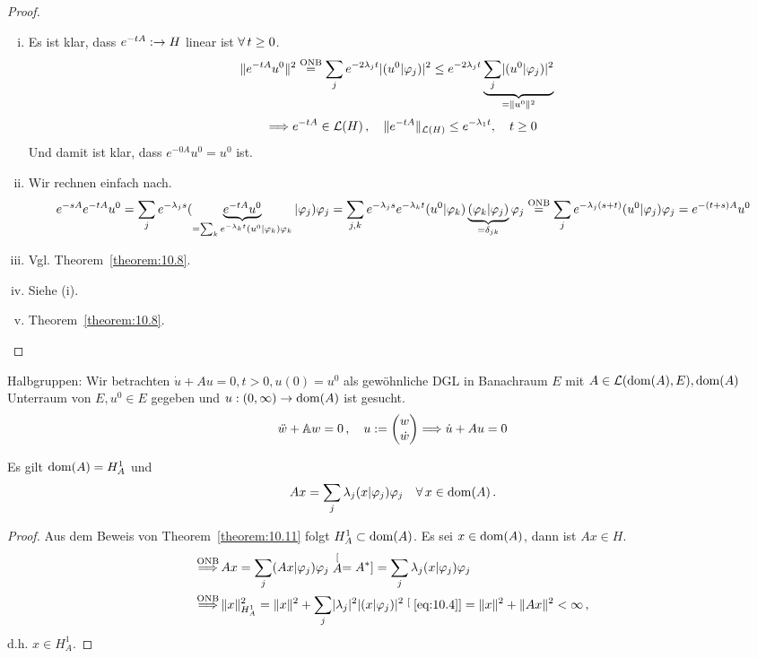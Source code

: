 \begin{proof}
\begin{enumerate}[(i)]
\item Es ist klar, dass $e^{-tA}: \rightarrow H$ linear ist $\forall \, t\geq 0$.
\begin{align*}
	\lVert e^{-tA} u^0\rVert^2 & \stackrel{\scriptsize\text{ONB}}=\sum_j e^{-2\lambda_j t} \lvert (u^0|\varphi_j)\rvert^2 
	 \leq e^{-2\lambda_j t} \underbrace{\sum_j \lvert (u^0|\varphi_j)\rvert^2}_{=\lVert u^0\rVert^2} 
\end{align*}
\[
	\Longrightarrow e^{-tA} \in \mathcal L(H)\, , \quad \lVert e^{-tA}\rVert_{\mathcal L(H)} \leq e^{-\lambda_1 t} , \quad t \geq 0
\]
Und damit ist klar, dass $e^{-0A} u^0 = u^0$ ist.
\item Wir rechnen einfach nach.
\begin{dmath*}
	e^{-sA} e^{-tA} u^0 = \sum_j e^{-\lambda_j s} (\underbrace{e^{-tA} u^0}_{=\sum_k e^{-\lambda_k t} (u^0|\varphi_k)\varphi_k} |\varphi_j)\varphi_j 
	= \sum_{j,k} e^{-\lambda_j s}e^{-\lambda_k t} (u^0 | \varphi_k) \underbrace{(\varphi_k |\varphi_j)}_{=\delta_{jk}} \varphi_j \\
	\stackrel{\scriptsize\text{ONB}}= \sum_j e^{-\lambda_j (s+t)} (u^0|\varphi_j)\varphi_j
	= e^{-(t+s)A} u^0
\end{dmath*}
\item Vgl. Theorem~\ref{theorem:10.8}.
\item Siehe (i).
\item Theorem~\ref{theorem:10.8}.\qedhere
\end{enumerate}
\end{proof}

Halbgruppen: Wir betrachten $\dot u + A u = 0, t>0, u(0)= u^0$ als gewöhnliche DGL in Banachraum $E$ mit $A\in\mathcal L(\operatorname{dom}(A),E), \operatorname{dom}(A)$ Unterraum von $E, u^0\in E$ gegeben und $u:(0,\infty) \rightarrow \operatorname{dom}(A)$ ist gesucht.
\[
	\ddot w + \mathbb{A} w = 0 \, , \quad u := \begin{pmatrix} w \\ \dot w \end{pmatrix}  \Longrightarrow \dot u + A u = 0
\]

\begin{kor}
\label{kor:10.12}
Es gilt $\operatorname{dom}(A) = H^1_A$ und
\[
	Ax = \sum_j \lambda_j (x|\varphi_j)\varphi_j \quad  \forall \, x \in \operatorname{dom}(A) \, .
\]
\end{kor}

\begin{proof}
Aus dem Beweis von Theorem~\ref{theorem:10.11} folgt $H^1_A \subset \operatorname{dom}(A)$. Es sei $x \in \operatorname{dom} (A)$, dann ist $Ax \in H$.
\begin{align}
	\label{eq:10.4}
	\stackrel{\scriptsize\text{ONB}}{\Longrightarrow} \, & Ax = \sum_j (Ax|\varphi_j)\varphi_j \stackrel[A=A^\ast]{}= \sum_{j} \lambda_j (x|\varphi_j)\varphi_j \\
	\stackrel{\scriptsize\text{ONB}}{\Longrightarrow} \, & \lVert x\rVert^2_{H^1_A} = \lVert x\rVert^2 + \sum_j \lvert \lambda_j\rvert^2\lvert (x|\varphi_j)\rvert^2 \stackrel[\scriptsize\eqref{eq:10.4}]{}= \lVert x\rVert^2 + \lVert Ax\rVert^2 < \infty \,  , \notag
\end{align}
d.h. $x \in H^1_A$.
\end{proof}


